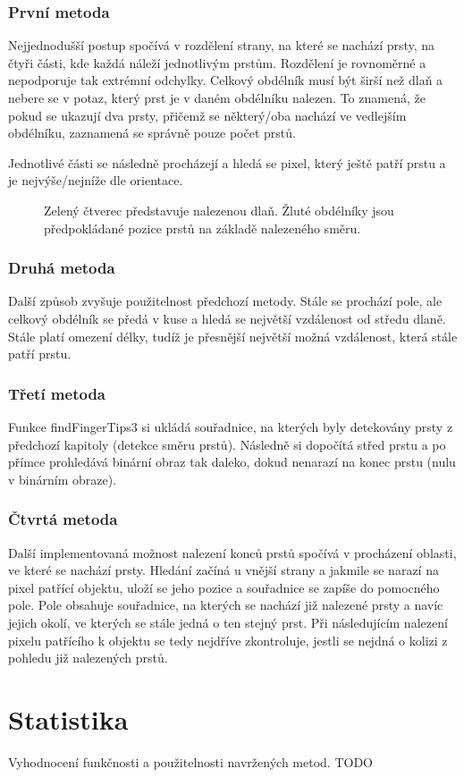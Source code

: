 \subsubsection{První metoda}
Nejjednodušší postup spočívá v rozdělení strany, na které se nachází prsty, na čtyři části, kde každá náleží jednotlivým prstům. Rozdělení je rovnoměrné a nepodporuje tak extrémní odchylky. Celkový obdélník musí být širší než dlaň a nebere se v potaz, který prst je v daném obdélníku nalezen. To znamená, že pokud se ukazují dva prsty, přičemž se některý/oba nachází ve vedlejším obdélníku, zaznamená se správně pouze počet prstů.

Jednotlivé části se následně procházejí a hledá se pixel, který ještě patří prstu a je nejvýše/nejníže dle orientace.\\

\begin{figure}[htp]
\centering
{}
\caption{Zelený čtverec představuje nalezenou dlaň. Žluté obdélníky jsou předpokládané pozice prstů na základě nalezeného směru.}
\label{pic20}
\end{figure}

\subsubsection{Druhá metoda}
Další způsob zvyšuje použitelnost předchozí metody. Stále se prochází pole, ale celkový obdélník se předá v kuse a hledá se největší vzdálenost od středu dlaně. Stále platí omezení délky, tudíž je přesnější největší možná vzdálenost, která stále patří prstu.

\subsubsection{Třetí metoda}
Funkce findFingerTips3 si ukládá souřadnice, na kterých byly detekovány prsty z předchozí kapitoly (detekce směru prstů). Následně si dopočítá střed prstu a po přímce prohledává binární obraz tak daleko, dokud nenarazí na konec prstu (nulu v binárním obraze). 

\subsubsection{Čtvrtá metoda}
Další implementovaná možnost nalezení konců prstů spočívá v procházení oblasti, ve které se nachází prsty. Hledání začíná u vnější strany a jakmile se narazí na pixel patřící objektu, uloží se jeho pozice a souřadnice se zapíše do pomocného pole. Pole obsahuje souřadnice, na kterých se nachází již nalezené prsty a navíc jejich okolí, ve kterých se stále jedná o ten stejný prst. Při následujícím nalezení pixelu patřícího k objektu se tedy nejdříve zkontroluje, jestli se nejdná o kolizi z pohledu již nalezených prstů.


\section{Statistika}
Vyhodnocení funkčnosti a použitelnosti navržených metod.
TODO

\endinput
